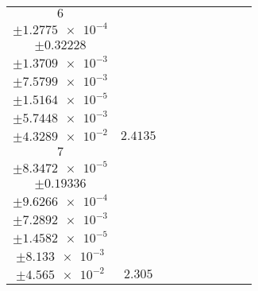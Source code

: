 \documentclass[8pt]{article}
\begin{document}
\begin{longtable}[l]{c c c c c c c c c}
$\num{6}$ & \begin{tabular}[c]{@{}c@{}}$\num{3.0219e-2}$ \\ $\pm\num{1.2775e-4}$\end{tabular} & \begin{tabular}[c]{@{}c@{}}$\num{0.15057}$ \\ $\pm\num{0.32228}$\end{tabular} & \begin{tabular}[c]{@{}c@{}}$\num{7.306}$ \\ $\pm\num{1.3709e-3}$\end{tabular} & \begin{tabular}[c]{@{}c@{}}$\num{1.8649e+3}$ \\ $\pm\num{7.5799e-3}$\end{tabular} & \begin{tabular}[c]{@{}c@{}}$\num{3.7308}$ \\ $\pm\num{1.5164e-5}$\end{tabular} & \begin{tabular}[c]{@{}c@{}}$\num{1.1322}$ \\ $\pm\num{5.7448e-3}$\end{tabular} & \begin{tabular}[c]{@{}c@{}}$\num{4.0588}$ \\ $\pm\num{4.3289e-2}$\end{tabular} & $\num{2.4135}$\\
$\num{7}$ & \begin{tabular}[c]{@{}c@{}}$\num{2.9971e-2}$ \\ $\pm\num{8.3472e-5}$\end{tabular} & \begin{tabular}[c]{@{}c@{}}$\num{0.13899}$ \\ $\pm\num{0.19336}$\end{tabular} & \begin{tabular}[c]{@{}c@{}}$\num{7.4913}$ \\ $\pm\num{9.6266e-4}$\end{tabular} & \begin{tabular}[c]{@{}c@{}}$\num{1.8651e+3}$ \\ $\pm\num{7.2892e-3}$\end{tabular} & \begin{tabular}[c]{@{}c@{}}$\num{3.7313}$ \\ $\pm\num{1.4582e-5}$\end{tabular} & \begin{tabular}[c]{@{}c@{}}$\num{1.1223}$ \\ $\pm\num{8.133e-3}$\end{tabular} & \begin{tabular}[c]{@{}c@{}}$\num{4.0993}$ \\ $\pm\num{4.565e-2}$\end{tabular} & $\num{2.305}$\\

\end{longtable}
\end{document}
